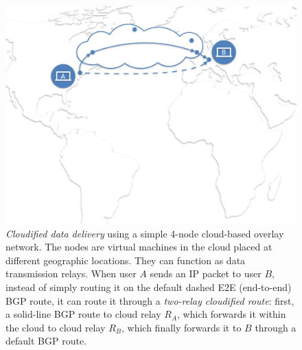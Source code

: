 \documentclass{hotnets17}
\newcommand{\mycomm}[3]{{\color{#2} \textbf{[#1: #3]}}}
\newcommand{\mycomm}[3]{}
\newcommand{\IK}[1]{\mycomm{IK}{blue}{#1}}
\begin{document}
\begin{figure}[t]
  \centering
    \includegraphics[width=\columnwidth]{figures/overlay-network}
    \caption{\textit{Cloudified data delivery} using a simple  4-node cloud-based overlay network. The nodes are virtual machines in the cloud placed at different geographic locations. They can function as data transmission relays. %
When user $A$ sends an IP packet to user $B$, instead of simply routing it on the default dashed E2E (end-to-end) BGP route, it can route it through a \textit{two-relay cloudified route}: first, a solid-line BGP route to cloud relay $R_A$, which forwards it within the cloud to cloud relay $R_B$, which  finally forwards it %
to $B$ through a default BGP route. %
    }
    \label{fig:overlay}
\end{figure}
\end{document}
